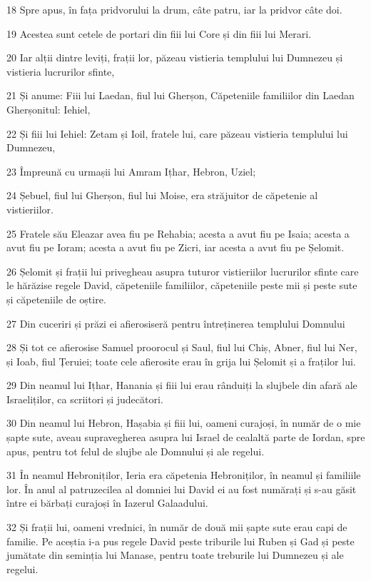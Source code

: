 \par 18 Spre apus, în fața pridvorului la drum, câte patru, iar la pridvor câte doi.
\par 19 Acestea sunt cetele de portari din fiii lui Core și din fiii lui Merari.
\par 20 Iar alții dintre leviți, frații lor, păzeau vistieria templului lui Dumnezeu și vistieria lucrurilor sfinte,
\par 21 Și anume: Fiii lui Laedan, fiul lui Gherșon, Căpeteniile familiilor din Laedan Gherșonitul: Iehiel,
\par 22 Și fiii lui Iehiel: Zetam și Ioil, fratele lui, care păzeau vistieria templului lui Dumnezeu,
\par 23 Împreună cu urmașii lui Amram Ițhar, Hebron, Uziel;
\par 24 Șebuel, fiul lui Gherșon, fiul lui Moise, era străjuitor de căpetenie al vistieriilor.
\par 25 Fratele său Eleazar avea fiu pe Rehabia; acesta a avut fiu pe Isaia; acesta a avut fiu pe Ioram; acesta a avut fiu pe Zicri, iar acesta a avut fiu pe Șelomit.
\par 26 Șelomit și frații lui privegheau asupra tuturor vistieriilor lucrurilor sfinte care le hărăzise regele David, căpeteniile familiilor, căpeteniile peste mii și peste sute și căpeteniile de oștire.
\par 27 Din cuceriri și prăzi ei afierosiseră pentru întreținerea templului Domnului
\par 28 Și tot ce afierosise Samuel proorocul și Saul, fiul lui Chiș, Abner, fiul lui Ner, și Ioab, fiul Țeruiei; toate cele afierosite erau în grija lui Șelomit și a fraților lui.
\par 29 Din neamul lui Ițhar, Hanania și fiii lui erau rânduiți la slujbele din afară ale Israeliților, ca scriitori și judecători.
\par 30 Din neamul lui Hebron, Hașabia și fiii lui, oameni curajoși, în număr de o mie șapte sute, aveau supravegherea asupra lui Israel de cealaltă parte de Iordan, spre apus, pentru tot felul de slujbe ale Domnului și ale regelui.
\par 31 În neamul Hebroniților, Ieria era căpetenia Hebroniților, în neamul și familiile lor. În anul al patruzecilea al domniei lui David ei au fost numărați și s-au găsit între ei bărbați curajoși în Iazerul Galaadului.
\par 32 Și frații lui, oameni vrednici, în număr de două mii șapte sute erau capi de familie. Pe aceștia i-a pus regele David peste triburile lui Ruben și Gad și peste jumătate din seminția lui Manase, pentru toate treburile lui Dumnezeu și ale regelui.


